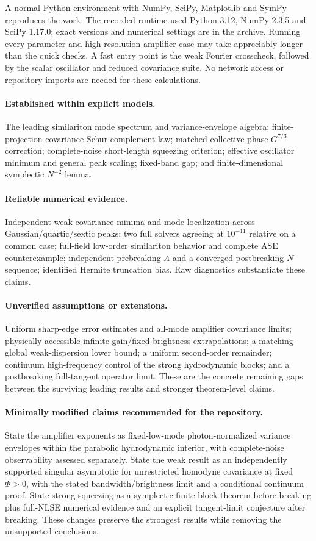 \documentclass[11pt,a4paper]{article}
\begin{document}
A normal Python environment with NumPy, SciPy, Matplotlib and SymPy reproduces the work. The recorded runtime used Python 3.12, NumPy 2.3.5 and SciPy 1.17.0; exact versions and numerical settings are in the archive. Running every parameter and high-resolution amplifier case may take appreciably longer than the quick checks. A fast entry point is the weak Fourier crosscheck, followed by the scalar oscillator and reduced covariance suite. No network access or repository imports are needed for these calculations.

\paragraph{Established within explicit models.} The leading similariton mode spectrum and variance-envelope algebra; finite-projection covariance Schur-complement law; matched collective phase $G^{7/3}$ correction; complete-noise short-length squeezing criterion; effective oscillator minimum and general peak scaling; fixed-band gap; and finite-dimensional symplectic $N^{-2}$ lemma.

\paragraph{Reliable numerical evidence.} Independent weak covariance minima and mode localization across Gaussian/quartic/sextic peaks; two full solvers agreeing at $10^{-11}$ relative on a common case; full-field low-order similariton behavior and complete ASE counterexample; independent prebreaking $\Lambda$ and a converged postbreaking $N$ sequence; identified Hermite truncation bias. Raw diagnostics substantiate these claims.

\paragraph{Unverified assumptions or extensions.} Uniform sharp-edge error estimates and all-mode amplifier covariance limits; physically accessible infinite-gain/fixed-brightness extrapolations; a matching global weak-dispersion lower bound; a uniform second-order remainder; continuum high-frequency control of the strong hydrodynamic blocks; and a postbreaking full-tangent operator limit. These are the concrete remaining gaps between the surviving leading results and stronger theorem-level claims.

\paragraph{Minimally modified claims recommended for the repository.} State the amplifier exponents as fixed-low-mode photon-normalized variance envelopes within the parabolic hydrodynamic interior, with complete-noise observability assessed separately. State the weak result as an independently supported singular asymptotic for unrestricted homodyne covariance at fixed $\Phi>0$, with the stated bandwidth/brightness limit and a conditional continuum proof. State strong squeezing as a symplectic finite-block theorem before breaking plus full-NLSE numerical evidence and an explicit tangent-limit conjecture after breaking. These changes preserve the strongest results while removing the unsupported conclusions.
\end{document}
